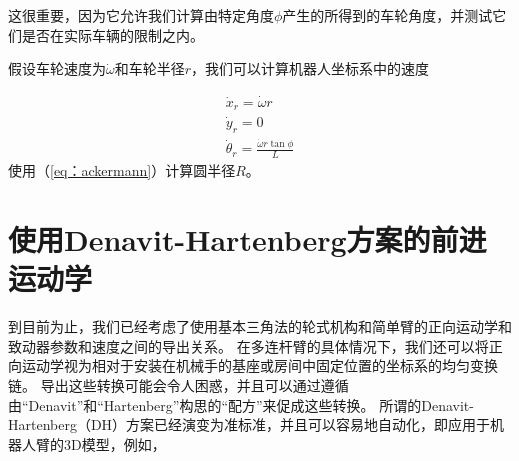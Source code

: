 这很重要，因为它允许我们计算由特定角度$ \phi $产生的所得到的车轮角度，并测试它们是否在实际车辆的限制之内。


假设车轮速度为$ \dot {\omega} $和车轮半径$ r $，我们可以计算机器人坐标系中的速度

\begin{eqnarray}
\dot{x}_r=\dot{\omega}r\\
\dot{y}_r=0\\
\dot{\theta}_r=\frac{\dot{\omega}r\tan\phi}{L}
\end{eqnarray}
使用（\ref {eq：ackermann}）计算圆半径$ R $。

\section{使用Denavit-Hartenberg方案的前进运动学}


到目前为止，我们已经考虑了使用基本三角法的轮式机构和简单臂的正向运动学和致动器参数和速度之间的导出关系。 在多连杆臂的具体情况下，我们还可以将正向运动学视为相对于安装在机械手的基座或房间中固定位置的坐标系的均匀变换链。 导出这些转换可能会令人困惑，并且可以通过遵循由“Denavit”和“Hartenberg”构思的“配方”来促成这些转换。 所谓的Denavit-Hartenberg（DH）方案已经演变为准标准，并且可以容易地自动化，即应用于机器人臂的3D模型，例如，

